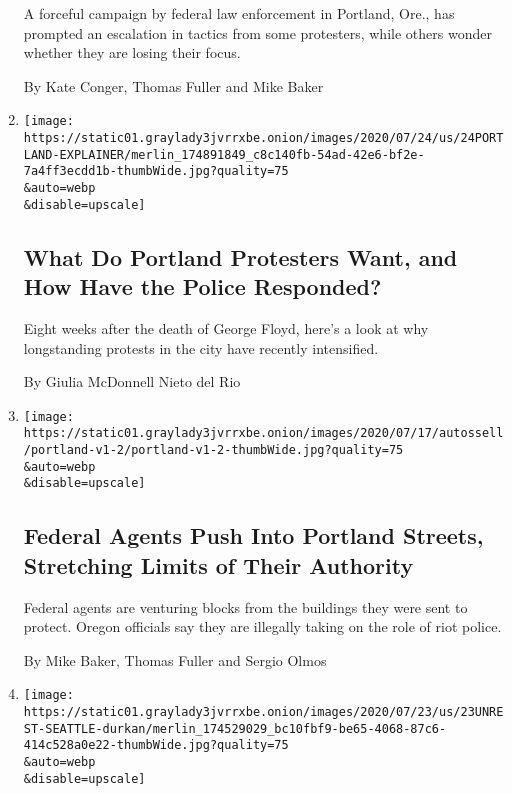 \begin{enumerate}
  A forceful campaign by federal law enforcement in Portland, Ore., has
  prompted an escalation in tactics from some protesters, while others
  wonder whether they are losing their focus.

  By Kate Conger, Thomas Fuller and Mike Baker
\item
  \href{/article/portland-protests-explained-protesters.html}{}

  \texttt{[image: https://static01.graylady3jvrrxbe.onion/images/2020/07/24/us/24PORTLAND-EXPLAINER/merlin\_174891849\_c8c140fb-54ad-42e6-bf2e-7a4ff3ecdd1b-thumbWide.jpg?quality=75\\\&auto=webp\\\&disable=upscale]}

  \hypertarget{what-do-portland-protesters-want-and-how-have-the-police-responded}{%
  \subsection{What Do Portland Protesters Want, and How Have the Police
  Responded?}\label{what-do-portland-protesters-want-and-how-have-the-police-responded}}

  Eight weeks after the death of George Floyd, here's a look at why
  longstanding protests in the city have recently intensified.

  By Giulia McDonnell Nieto del Rio
\item
  \href{/2020/07/25/us/portland-federal-legal-jurisdiction-courts.html}{}

  \texttt{[image: https://static01.graylady3jvrrxbe.onion/images/2020/07/17/autossell/portland-v1-2/portland-v1-2-thumbWide.jpg?quality=75\\\&auto=webp\\\&disable=upscale]}

  \hypertarget{federal-agents-push-into-portland-streets-stretching-limits-of-their-authority}{%
  \subsection{Federal Agents Push Into Portland Streets, Stretching
  Limits of Their
  Authority}\label{federal-agents-push-into-portland-streets-stretching-limits-of-their-authority}}

  Federal agents are venturing blocks from the buildings they were sent
  to protect. Oregon officials say they are illegally taking on the role
  of riot police.

  By Mike Baker, Thomas Fuller and Sergio Olmos
\item
  \href{/2020/07/23/us/seattle-protests-feds.html}{}

  \texttt{[image: https://static01.graylady3jvrrxbe.onion/images/2020/07/23/us/23UNREST-SEATTLE-durkan/merlin\_174529029\_bc10fbf9-be65-4068-87c6-414c528a0e22-thumbWide.jpg?quality=75\\\&auto=webp\\\&disable=upscale]}


\end{enumerate}
